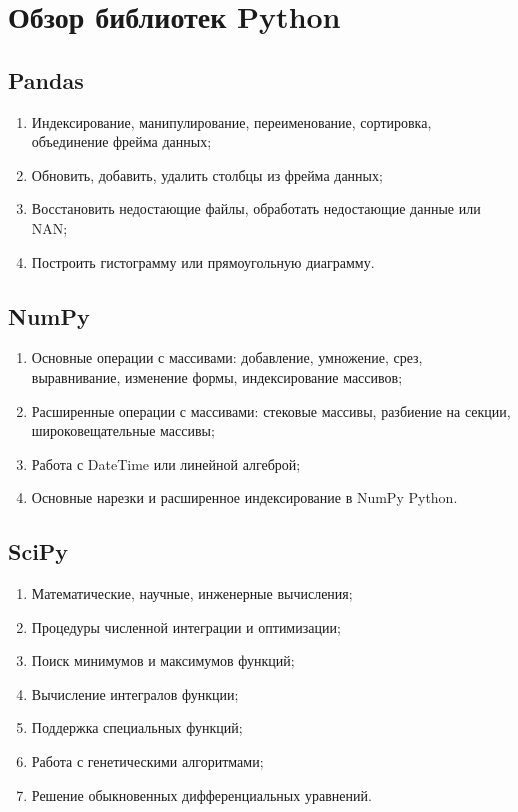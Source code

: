 \newpage
{}
\section*{Обзор библиотек Python}

\subsection*{Pandas}

\begin{enumerate}
	\item Индексирование, манипулирование, переименование, сортировка, объединение фрейма данных;
	\item Обновить, добавить, удалить столбцы из фрейма данных;
	\item Восстановить недостающие файлы, обработать недостающие данные или NAN;
	\item Построить гистограмму или прямоугольную диаграмму.
\end{enumerate}

\subsection*{NumPy}

\begin{enumerate}
	\item Основные операции с массивами: добавление, умножение, срез, выравнивание, изменение формы, индексирование массивов;
	\item Расширенные операции с массивами: стековые массивы, разбиение на секции, широковещательные массивы;
	\item Работа с DateTime или линейной алгеброй;
	\item Основные нарезки и расширенное индексирование в NumPy Python.
\end{enumerate}

\subsection*{SciPy}

\begin{enumerate}
	\item Математические, научные, инженерные вычисления;	
	\item Процедуры численной интеграции и оптимизации;
	\item Поиск минимумов и максимумов функций;
	\item Вычисление интегралов функции;
	\item Поддержка специальных функций;
	\item Работа с генетическими алгоритмами;
	\item Решение обыкновенных дифференциальных уравнений.
\end{enumerate}

